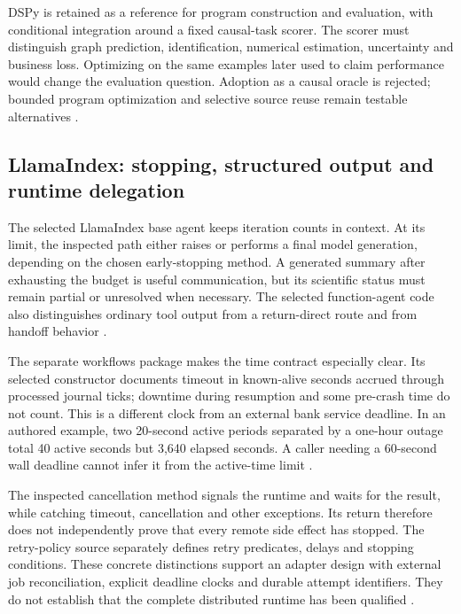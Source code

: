DSPy is retained as a reference for program construction and evaluation,
with conditional integration around a fixed causal-task scorer. The
scorer must distinguish graph prediction, identification, numerical
estimation, uncertainty and business loss. Optimizing on the same examples
later used to claim performance would change the evaluation question.
Adoption as a causal oracle is rejected; bounded program optimization and
selective source reuse remain testable alternatives
\cite{exec24_framework_contracts}.

\subsection{LlamaIndex: stopping, structured output and runtime delegation}
The selected LlamaIndex base agent keeps iteration counts in context.
At its limit, the inspected path either raises or performs a final model
generation, depending on the chosen early-stopping method. A generated
summary after exhausting the budget is useful communication, but its
scientific status must remain partial or unresolved when necessary.
The selected function-agent code also distinguishes ordinary tool output
from a return-direct route and from handoff behavior
\cite{exec24_framework_llama_index}.

The separate workflows package makes the time contract especially clear.
Its selected constructor documents timeout in known-alive seconds accrued
through processed journal ticks; downtime during resumption and some
pre-crash time do not count. This is a different clock from an external
bank service deadline. In an authored example, two 20-second active
periods separated by a one-hour outage total 40 active seconds but
3,640 elapsed seconds. A caller needing a 60-second wall deadline cannot
infer it from the active-time limit
\cite{exec24_framework_workflows,exec24_framework_contracts}.

The inspected cancellation method signals the runtime and waits for the
result, while catching timeout, cancellation and other exceptions. Its
return therefore does not independently prove that every remote side
effect has stopped. The retry-policy source separately defines retry
predicates, delays and stopping conditions. These concrete distinctions
support an adapter design with external job reconciliation, explicit
deadline clocks and durable attempt identifiers. They do not establish
that the complete distributed runtime has been qualified
\cite{exec24_framework_workflows,exec24_framework_contracts}.

